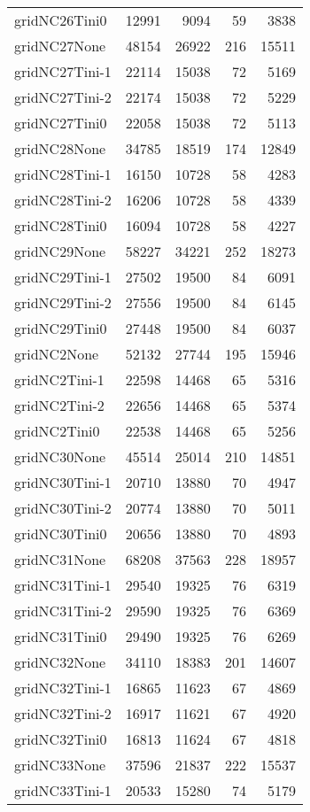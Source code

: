 \begin{longtable}{lrrrr}
gridNC26Tini0 & 12991 & 9094 & 59 & 3838 \\
gridNC27None & 48154 & 26922 & 216 & 15511 \\
gridNC27Tini-1 & 22114 & 15038 & 72 & 5169 \\
gridNC27Tini-2 & 22174 & 15038 & 72 & 5229 \\
gridNC27Tini0 & 22058 & 15038 & 72 & 5113 \\
gridNC28None & 34785 & 18519 & 174 & 12849 \\
gridNC28Tini-1 & 16150 & 10728 & 58 & 4283 \\
gridNC28Tini-2 & 16206 & 10728 & 58 & 4339 \\
gridNC28Tini0 & 16094 & 10728 & 58 & 4227 \\
gridNC29None & 58227 & 34221 & 252 & 18273 \\
gridNC29Tini-1 & 27502 & 19500 & 84 & 6091 \\
gridNC29Tini-2 & 27556 & 19500 & 84 & 6145 \\
gridNC29Tini0 & 27448 & 19500 & 84 & 6037 \\
gridNC2None & 52132 & 27744 & 195 & 15946 \\
gridNC2Tini-1 & 22598 & 14468 & 65 & 5316 \\
gridNC2Tini-2 & 22656 & 14468 & 65 & 5374 \\
gridNC2Tini0 & 22538 & 14468 & 65 & 5256 \\
gridNC30None & 45514 & 25014 & 210 & 14851 \\
gridNC30Tini-1 & 20710 & 13880 & 70 & 4947 \\
gridNC30Tini-2 & 20774 & 13880 & 70 & 5011 \\
gridNC30Tini0 & 20656 & 13880 & 70 & 4893 \\
gridNC31None & 68208 & 37563 & 228 & 18957 \\
gridNC31Tini-1 & 29540 & 19325 & 76 & 6319 \\
gridNC31Tini-2 & 29590 & 19325 & 76 & 6369 \\
gridNC31Tini0 & 29490 & 19325 & 76 & 6269 \\
gridNC32None & 34110 & 18383 & 201 & 14607 \\
gridNC32Tini-1 & 16865 & 11623 & 67 & 4869 \\
gridNC32Tini-2 & 16917 & 11621 & 67 & 4920 \\
gridNC32Tini0 & 16813 & 11624 & 67 & 4818 \\
gridNC33None & 37596 & 21837 & 222 & 15537 \\
gridNC33Tini-1 & 20533 & 15280 & 74 & 5179 \\

\end{longtable}
